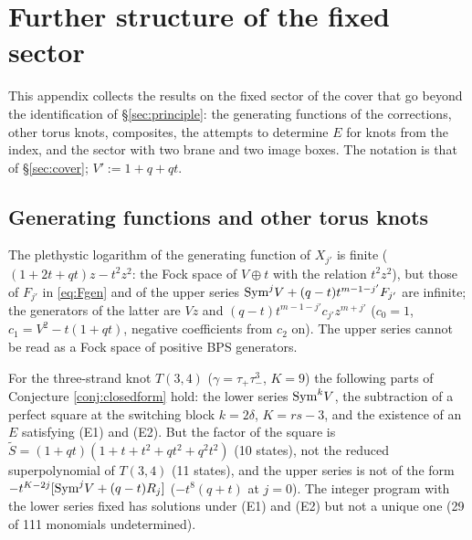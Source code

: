 \section{Further structure of the fixed sector}\label{app:fixed}
This appendix collects the results on the fixed sector of the cover that go beyond the identification of \S\ref{sec:principle}: the generating functions of the corrections, other torus knots, composites, the attempts to determine $E$ for knots from the index, and the sector with two brane and two image boxes. The notation is that of \S\ref{sec:cover}; $V' := 1 + q + qt$.

\subsection{Generating functions and other torus knots}
\begin{result}\label{cr:plog}
The plethystic logarithm of the generating function of $X_{j'}$ is finite ($(1+2t+qt)z - t^2z^2$: the Fock space of $V\oplus t$ with the relation $t^2z^2$), but those of $F_{j'}$ in \eqref{eq:Fgen} and of the upper series $\mathrm{Sym}^jV + (q-t)t^{m-1-j'}F_{j'}$ are infinite; the generators of the latter are $Vz$ and $(q-t)t^{m-1-j'}c_{j'}z^{m+j'}$ ($c_0 = 1$, $c_1 = V^2 - t(1+qt)$, negative coefficients from $c_2$ on). The upper series cannot be read as a Fock space of positive BPS generators.
\end{result}
\begin{result}\label{cr:t34}
For the three-strand knot $T(3,4)$ ($\gamma = \tau_+\tau_-^3$, $K = 9$) the following parts of Conjecture \ref{conj:closedform} hold: the lower series $\mathrm{Sym}^kV$, the subtraction of a perfect square at the switching block $k = 2\delta$, $K = rs - 3$, and the existence of an $E$ satisfying (E1) and (E2). But the factor of the square is $\tilde S = (1+qt)(1+t+t^2+qt^2+q^2t^2)$ (10 states), not the reduced superpolynomial of $T(3,4)$ (11 states), and the upper series is not of the form $-t^{K-2j}[\mathrm{Sym}^jV + (q-t)R_j]$ ($-t^8(q+t)$ at $j = 0$). The integer program with the lower series fixed has solutions under (E1) and (E2) but not a unique one (29 of 111 monomials undetermined).
\end{result}
